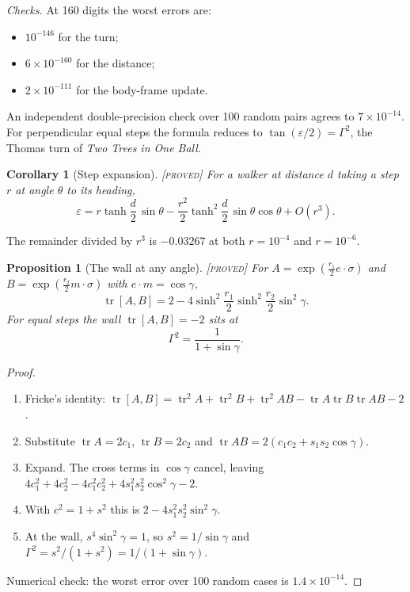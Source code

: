 \documentclass[11pt]{article}
\newtheorem{proposition}{Proposition}
\newtheorem{corollary}{Corollary}
\theoremstyle{definition}
\theoremstyle{remark}
\newcommand{\grade}[1]{\textsc{[#1]}}
\begin{document}
\noindent\emph{Checks.} At 160 digits the worst errors are:
\begin{itemize}
\item $10^{-146}$ for the turn;
\item $6\times10^{-160}$ for the distance;
\item $2\times10^{-111}$ for the body-frame update.
\end{itemize}
An independent double-precision check over 100 random pairs agrees to $7\times10^{-14}$. For perpendicular equal steps the formula reduces to $\tan(\varepsilon/2)=\Gamma^2$, the Thomas turn of \emph{Two Trees in One Ball}.

\begin{corollary}[Step expansion] \grade{proved}
For a walker at distance $d$ taking a step $r$ at angle $\theta$ to its heading,
\[
\varepsilon=r\tanh\frac d2\,\sin\theta-\frac{r^2}{2}\tanh^2\frac d2\,\sin\theta\cos\theta+O(r^3).
\]
\end{corollary}
\noindent The remainder divided by $r^3$ is $-0.03267$ at both $r=10^{-4}$ and $r=10^{-6}$.

\begin{proposition}[The wall at any angle] \grade{proved}
For $A=\exp(\tfrac{r_1}{2}e\cdot\sigma)$ and $B=\exp(\tfrac{r_2}{2}m\cdot\sigma)$ with $e\cdot m=\cos\gamma$,
\[
\operatorname{tr}[A,B]=2-4\sinh^2\frac{r_1}{2}\sinh^2\frac{r_2}{2}\sin^2\gamma .
\]
For equal steps the wall $\operatorname{tr}[A,B]=-2$ sits at
\[
\Gamma^2=\frac{1}{1+\sin\gamma}.
\]
\end{proposition}
\begin{proof}
\begin{enumerate}
\item Fricke's identity: $\operatorname{tr}[A,B]=\operatorname{tr}^2A+\operatorname{tr}^2B+\operatorname{tr}^2AB-\operatorname{tr}A\operatorname{tr}B\operatorname{tr}AB-2$.
\item Substitute $\operatorname{tr}A=2c_1$, $\operatorname{tr}B=2c_2$ and $\operatorname{tr}AB=2(c_1c_2+s_1s_2\cos\gamma)$.
\item Expand. The cross terms in $\cos\gamma$ cancel, leaving $4c_1^2+4c_2^2-4c_1^2c_2^2+4s_1^2s_2^2\cos^2\gamma-2$.
\item With $c^2=1+s^2$ this is $2-4s_1^2s_2^2\sin^2\gamma$.
\item At the wall, $s^4\sin^2\gamma=1$, so $s^2=1/\sin\gamma$ and $\Gamma^2=s^2/(1+s^2)=1/(1+\sin\gamma)$.
\end{enumerate}
Numerical check: the worst error over 100 random cases is $1.4\times10^{-14}$.
\end{proof}
\end{document}
